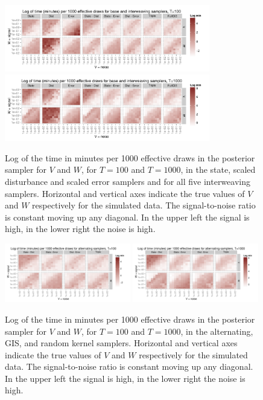 \documentclass{article}
\begin{document}
\begin{figure}[!ht]
\centering
\includegraphics[width=0.8\textwidth]{plots/baseinttimeplot1}
\includegraphics[width=0.8\textwidth]{plots/baseinttimeplot2}
\caption{Log of the time in minutes per 1000 effective draws in the posterior sampler for $V$ and $W$, for $T=100$ and $T=1000$, in the state, scaled disturbance and scaled error samplers and for all five interweaving samplers. Horizontal and vertical axes indicate the true values of $V$ and $W$ respectively for the simulated data. The signal-to-noise ratio is constant moving up any diagonal. In the upper left the signal is high, in the lower right the noise is high.}
\label{baseinttimeplot}
\end{figure}


\begin{figure}[!ht]
\centering
\includegraphics[width=0.49\textwidth]{plots/altinttimeplot1}
\includegraphics[width=0.49\textwidth]{plots/altinttimeplot2}
\caption{Log of the time in minutes per 1000 effective draws in the posterior sampler for $V$ and $W$, for $T=100$ and $T=1000$, in the alternating, GIS, and random kernel samplers. Horizontal and vertical axes indicate the true values of $V$ and $W$ respectively for the simulated data. The signal-to-noise ratio is constant moving up any diagonal. In the upper left the signal is high, in the lower right the noise is high.}
\label{altinttimeplot}
\end{figure}
\end{document}
